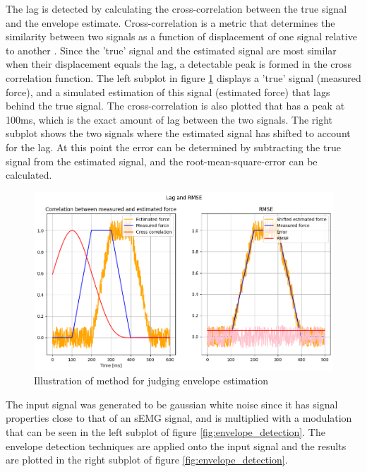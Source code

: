 The lag is detected by calculating the cross-correlation between the true signal and the envelope estimate. Cross-correlation is a metric that determines the similarity between two signals as a function of displacement of one signal relative to another \cite{wiki:cross_correlation}. Since the 'true' signal and the estimated signal are most similar when their displacement equals the lag, a detectable peak is formed in the cross correlation function. The left subplot in figure \ref{fig:envelope_estimation_method} displays a 'true' signal (measured force), and a simulated estimation of this signal (estimated force) that lags behind the true signal. The cross-correlation is also plotted that has a peak at 100ms, which is the exact amount of lag between the two signals. The right subplot shows the two signals where the estimated signal has shifted to account for the lag. At this point the error can be determined by subtracting the true signal from the estimated signal, and the root-mean-square-error can be calculated. 

\begin{figure}[h!t]
	\begin{center}
		\includegraphics[width=1.0\columnwidth]{images/envelope_estimation_method.png}
	\end{center}
	\caption{Illustration of method for judging envelope estimation}
	\label{fig:envelope_estimation_method}
\end{figure}

The input signal was generated to be gaussian white noise since it has signal properties close to that of an sEMG signal, and is multiplied with a modulation that can be seen in the left subplot of figure \ref{fig:envelope_detection}. The envelope detection techniques are applied onto the input signal and the results are plotted in the right subplot of figure \ref{fig:envelope_detection}.

